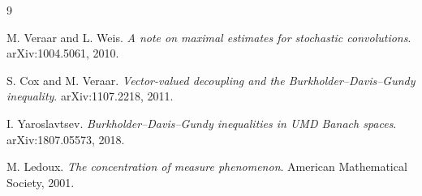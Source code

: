 \documentclass[11pt]{article}
\begin{document}
\begin{thebibliography}{9}

M. Veraar and L. Weis.
\newblock \emph{A note on maximal estimates for stochastic convolutions}.
\newblock arXiv:1004.5061, 2010.

S. Cox and M. Veraar.
\newblock \emph{Vector-valued decoupling and the Burkholder--Davis--Gundy
inequality}.
\newblock arXiv:1107.2218, 2011.

I. Yaroslavtsev.
\newblock \emph{Burkholder--Davis--Gundy inequalities in UMD Banach spaces}.
\newblock arXiv:1807.05573, 2018.

M. Ledoux.
\newblock \emph{The concentration of measure phenomenon}.
\newblock American Mathematical Society, 2001.

\end{thebibliography}
\end{document}

